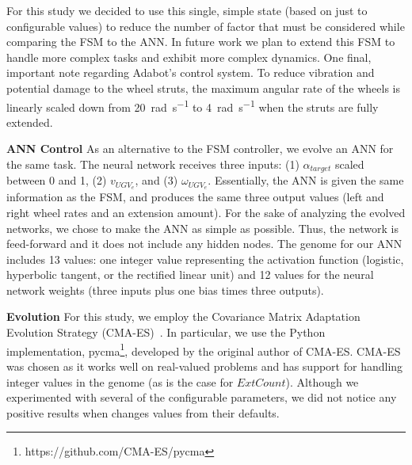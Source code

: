 For this study we decided to use this single, simple state (based on just to configurable values) to reduce the number of factor that must be considered while comparing the FSM to the ANN.
%
In future work we plan to extend this FSM to handle more complex tasks and exhibit more complex dynamics.
%
One final, important note regarding Adabot's control system. To reduce vibration and potential damage to the wheel struts, the maximum angular rate of the wheels is linearly scaled down from 20~\si{\radian\per\second} to 4~\si{\radian\per\second} when the struts are fully extended.


\vspace{0.1in}
\noindent
\textbf{ANN Control}
As an alternative to the FSM controller, we evolve an ANN for the same task.
%
The neural network receives three inputs: (1) $\alpha_{\mathit{target}}$ scaled between 0 and 1, (2) $v_{\mathit{UGV}_e}$, and (3) $\omega_{\mathit{UGV}_e}$.
%
Essentially, the ANN is given the same information as the FSM, and produces the same three output values (left and right wheel rates and an extension amount).
%
For the sake of analyzing the evolved networks, we chose to make the ANN as simple as possible. Thus, the network is feed-forward and it does not include any hidden nodes.
%
The genome for our ANN includes 13 values: one integer value representing the activation function (logistic, hyperbolic tangent, or the rectified linear unit) and 12 values for the neural network weights (three inputs plus one bias times three outputs).



\vspace{0.1in}
\noindent
\textbf{Evolution}
%
For this study, we employ the Covariance Matrix Adaptation Evolution Strategy (CMA-ES)~\autocite{Hansen.2003.EC.CMAES}.
%
In particular, we use the Python implementation, pycma\footnote{https://github.com/CMA-ES/pycma}, developed by the original author of CMA-ES.
%
CMA-ES was chosen as it works well on real-valued problems and has support for handling integer values in the genome (as is the case for $\mathit{ExtCount}$).
%
Although we experimented with several of the configurable parameters, we did not notice any positive results when changes values from their defaults.
